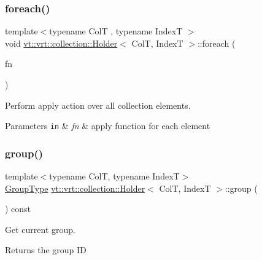 \subsubsection{\texorpdfstring{foreach()}{foreach()}}
{\footnotesize\ttfamily template$<$typename ColT , typename IndexT $>$ \\
void \hyperlink{structvt_1_1vrt_1_1collection_1_1_holder}{vt\+::vrt\+::collection\+::\+Holder}$<$ ColT, IndexT $>$\+::foreach (\begin{DoxyParamCaption}\item[{\hyperlink{structvt_1_1vrt_1_1collection_1_1_holder_a26e20d23447e935e218a07ffd638706d}{Func\+Apply\+Type}}]{fn }\end{DoxyParamCaption})}



Perform apply action over all collection elements. 


\begin{DoxyParams}[1]{Parameters}
\mbox{\tt in}  & {\em fn} & apply function for each element \\
\hline
\end{DoxyParams}
\mbox{\label{structvt_1_1vrt_1_1collection_1_1_holder_a579e33999a2d66ded9c3751be3ba11f8}} 
\subsubsection{\texorpdfstring{group()}{group()}}
{\footnotesize\ttfamily template$<$typename ColT, typename IndexT$>$ \\
\hyperlink{namespacevt_a27b5e4411c9b6140c49100e050e2f743}{Group\+Type} \hyperlink{structvt_1_1vrt_1_1collection_1_1_holder}{vt\+::vrt\+::collection\+::\+Holder}$<$ ColT, IndexT $>$\+::group (\begin{DoxyParamCaption}{ }\end{DoxyParamCaption}) const\hspace{0.3cm}{\ttfamily [inline]}}



Get current group. 

\begin{DoxyReturn}{Returns}
the group ID 
\end{DoxyReturn}
\mbox{\label{structvt_1_1vrt_1_1collection_1_1_holder_afeafe4c77613531a166be80bdaea4fd6}} 
